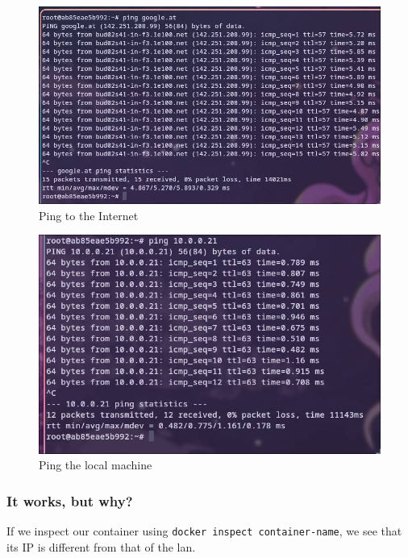 \documentclass[a4paper]{article}
\begin{document}
\begin{figure}[h]
	\centering
	\includegraphics[scale=0.3]{images/ping_internet.png}
	\caption{Ping to the Internet}
\end{figure}
\begin{figure}[h]
	\centering
	\includegraphics[scale=0.3]{images/ping_lokal.png}
	\caption{Ping the local machine}
\end{figure}
\newpage
\subsubsection {It works, but why?}

If we inspect our container using \texttt{docker inspect container-name}, we see that its IP is different from that of the lan.
\end{document}
